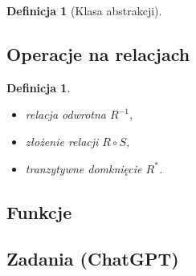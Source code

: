 \documentclass[12pt]{article}
\newtheorem{dfn}[thm]{Definicja}
\begin{document}
\begin{dfn}[Klasa abstrakcji]
\end{dfn}

\subsection{Operacje na relacjach}

\begin{dfn}
	\begin{itemize}
		\item relacja odwrotna $R^{-1}$,
		\item złożenie relacji $R\circ S$,
		\item tranzytywne domknięcie $R^*$.
	\end{itemize}
\end{dfn}

	
\subsection{Funkcje}


\subsection{Zadania (ChatGPT)}
\end{document}
